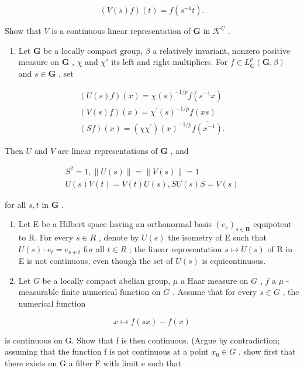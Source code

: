 \[
(V (s) f) (t) = f \left(s ^ {- 1} t\right).
\]

Show that \(V\) is a continuous linear representation of \(\mathbf{G}\) in \(\mathcal{K}^U\) .

\begin{enumerate}
\def\labelenumi{\arabic{enumi})}
\setcounter{enumi}{5}
\tightlist
\item
  Let \(\mathbf{G}\) be a locally compact group, \(\beta\) a relatively invariant, nonzero positive measure on \(\mathbf{G}\) , \(\chi\) and \(\chi'\) its left and right multipliers. For \(f \in L_{\mathbf{C}}^{p}(\mathbf{G}, \beta)\) and \(s \in \mathbf{G}\) , set
\end{enumerate}

\[
\begin{array}{c} (U (s) f) (x) = \chi (s) ^ {- 1 / p} f (s ^ {- 1} x) \\ (V (s) f) (x) = \chi^ {\prime} (s) ^ {- 1 / p} f (x s) \\ (S f) (x) = (\chi \chi^ {\prime}) (x) ^ {- 1 / p} \overline {{f (x ^ {- 1})}}. \end{array}
\]

Then \(U\) and \(V\) are linear representations of \(\mathbf{G}\) , and

\[
\begin{array}{c} S ^ {2} = 1, \| U (s) \| = \| V (s) \| = 1 \\ U (s) V (t) = V (t) U (s), S U (s) S = V (s) \end{array}
\]

for all \(s, t\) in \(\mathbf{G}\) .

\begin{enumerate}
\def\labelenumi{\arabic{enumi})}
\setcounter{enumi}{6}
\item
  Let E be a Hilbert space having an orthonormal basis \((e_{s})_{s\in\mathbf{R}}\) equipotent to R. For every \(s\in R\) , denote by \(U(s)\) the isometry of E such that \(U(s)\cdot e_{t}=e_{s+t}\) for all \(t\in R\) ; the linear representation \(s\mapsto U(s)\) of R in E is not continuous, even though the set of \(U(s)\) is equicontinuous.
\item
  Let \(G\) be a locally compact abelian group, \(\mu\) a Haar measure on \(G\) , \(f\) a \(\mu\) -measurable finite numerical function on \(G\) . Assume that for every \(s \in G\) , the numerical function
\end{enumerate}

\[
x \mapsto f (s x) - f (x)
\]

is continuous on G. Show that f is then continuous. (Argue by contradiction; assuming that the function f is not continuous at a point \(x_{0} \in G\) , show first that there exists on G a filter F with limit e such that

